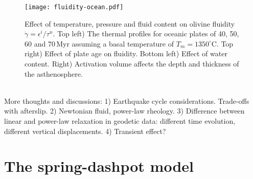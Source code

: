 \documentclass[letterpaper,12pt,]{memoir}
\begin{document}
%
\begin{sidewaysfigure}[p]
\texttt{[image: fluidity-ocean.pdf]}
\caption{Effect of temperature, pressure and fluid content on olivine fluidity $\dot{\gamma}=\epsilon^i/\tau^n$. Top left) The thermal profiles for oceanic plates of 40, 50, 60 and 70\,Myr assuming a basal temperature of $T_m=1350^\circ$C. Top right) Effect of plate age on fluidity. Bottom left) Effect of water content. Right) Activation volume affects the depth and thickness of the asthenosphere.}
\label{fig:fluidity}
\end{sidewaysfigure}
%
\\
More thoughts and discussions:
1) Earthquake cycle considerations. Trade-offs with afterslip.
2) Newtonian fluid, power-law rheology.
3) Difference between linear and power-law relaxation in geodetic data: different time evolution, different vertical displacements. 
4) Transient effect?

%
\clearpage
\section{The spring-dashpot model}
\end{document}
